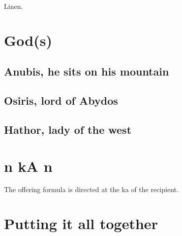 Linen.

\section*{God(s)}

\subsection*{Anubis, he sits on his mountain}

\subsection*{Osiris, lord of Abydos}

\subsection*{Hathor, lady of the west}

\section*{n kA n}

The offering formula is directed at the ka of the recipient.

\section*{Putting it all together}